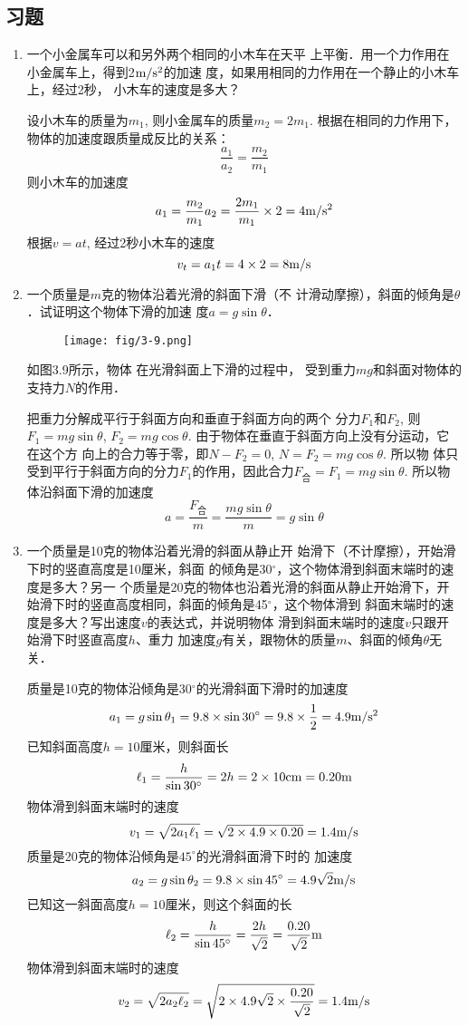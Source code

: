 \subsection{习题}
\begin{enumerate}
    \item 一个小金属车可以和另外两个相同的小木车在天平
上平衡．用一个力作用在小金属车上，得到2$\text{m}/\text{s}^2$的加速
度，如果用相同的力作用在一个静止的小木车上，经过2秒，
小木车的速度是多大？

\begin{solution}
    设小木车的质量为$m_1$, 则小金属车的质量$m_2=2m_1$.
根据在相同的力作用下，物体的加速度跟质量成反比的关系：
\[\frac{a_1}{a_2}=\frac{m_2}{m_1}\]
则小木车的加速度
\[a_1=\frac{m_2}{m_1}a_2=\frac{2m_1}{m_1}\times 2=4\text{m}/\text{s}^2\]
根据$v=at$, 经过2秒小木车的速度
\[v_t=a_1t=4\times2=8\text{m}/\text{s}\]
\end{solution}
\item  一个质量是$m$克的物体沿着光滑的斜面下滑（不
计滑动摩擦），斜面的倾角是$\theta$．试证明这个物体下滑的加速
度$a=g\sin\theta$．

\begin{figure}[htp]
    \centering
\texttt{[image: fig/3-9.png]}
    \caption{}
\end{figure}

\begin{solution}
如图3.9所示，物体
在光滑斜面上下滑的过程中，
受到重力$mg$和斜面对物体的
支持力$N$的作用．

把重力分解成平行于斜面方向和垂直于斜面方向的两个
分力$F_1$和$F_2$, 则$F_1=mg\sin\theta$, $F_2=mg\cos\theta$.
由于物体在垂直于斜面方向上没有分运动，它在这个方
向上的合力等于零，即$N-F_2=0$, $N=F_2=mg\cos\theta$. 所以物
体只受到平行于斜面方向的分力$F_1$的作用，因此合力$F_{\text{合}}=F_1=mg\sin\theta$. 所以物体沿斜面下滑的加速度
\[a=\frac{F_{\text{合}}}{m}=\frac{mg\sin\theta}{m}=g\sin\theta\]
\end{solution}
\item  一个质量是10克的物体沿着光滑的斜面从静止开
始滑下（不计摩擦），开始滑下时的竖直高度是10厘米，斜面
的倾角是30$^\circ$，这个物体滑到斜面末端时的速度是多大？另一
个质量是20克的物体也沿着光滑的斜面从静止开始滑下，开
始滑下时的竖直高度相同，斜面的倾角是45$^\circ$，这个物体滑到
斜面末端时的速度是多大？写出速度$v$的表达式，并说明物体
滑到斜面末端时的速度$v$只跟开始滑下时竖直高度$h$、重力
加速度$g$有关，跟物休的质量$m$、斜面的倾角$\theta$无关．

\begin{solution}
    质量是10克的物体沿倾角是30$^\circ$的光滑斜面下滑时的加速度
\[a_1=g\sin\theta_1=9.8\times \sin 30^\circ=9.8\times \frac{1}{2}=4.9\text{m}/\text{s}^2\]
已知斜面高度$h=10$厘米，则斜面长
\[\ell_1=\frac{h}{\sin 30^{\circ}}=2h=2\times 10{\rm cm}=0.20{\rm m}\]
物体滑到斜面末端时的速度
\[v_1=\sqrt{2a_1\ell_1}=\sqrt{2\times4.9\times0.20}=1.4\text{m}/\text{s}\]
质量是20克的物体沿倾角是$45^{\circ}$的光滑斜面滑下时的
加速度
\[a_2=g\sin\theta_2=9.8\times\sin45^{\circ}=4.9\sqrt{2}\text{m}/\text{s}\]
已知这一斜面高度$h=10$厘米，则这个斜面的长
\[\ell_2=\frac{h}{\sin 45^{\circ}}=\frac{2h}{\sqrt{2}}=\frac{0.20}{\sqrt{2}}{\rm m}\]
物体滑到斜面末端时的速度
\[v_2=\sqrt{2a_2\ell_2}=\sqrt{2\times4.9\sqrt{2}\times\frac{0.20}{\sqrt{2}}}=1.4\text{m}/\text{s}\]


\end{solution}
\end{enumerate}
